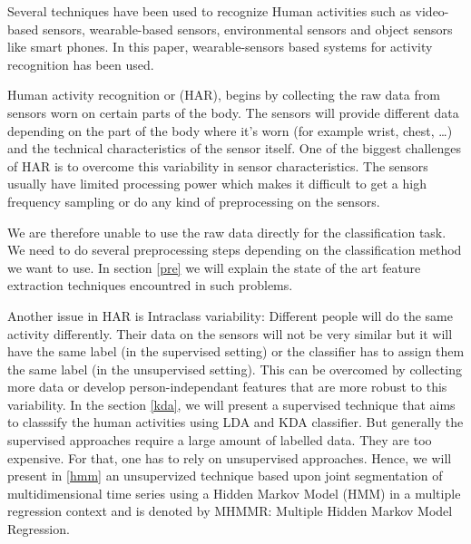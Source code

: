 \documentclass[11pt,a4paper,oneside]{article}
\begin{document}
Several techniques have been used to recognize Human activities such as video-based sensors, wearable-based sensors, environmental sensors and object sensors like smart phones. In this paper, wearable-sensors based systems for activity recognition has been used. 

Human activity recognition or (HAR), begins by collecting the raw data from sensors worn on certain parts of the body. The sensors will provide different data depending on the part of the body where it’s worn (for example wrist, chest, \ldots) and the technical characteristics of the sensor itself. One of the biggest challenges of HAR is to overcome this variability in sensor characteristics. The sensors usually have limited processing power which makes it difficult to get a high frequency sampling or do any kind of preprocessing on the sensors.\cite{bulling}

We are therefore unable to use the raw data directly for the classification task. We need to do several preprocessing steps depending on the classification method we want to use. In section \ref{pre} we will explain the state of the art feature extraction techniques encountred in such problems.

Another issue in HAR is Intraclass variability: Different people will do the same activity differently. Their data on the sensors will not be very similar but it will have the same label (in the supervised setting) or the classifier has to assign them the same label (in the unsupervised setting). This can be overcomed by collecting more data or develop person-independant features that are more robust to this variability. In the section \ref{kda}, we will present a supervised technique that aims to classsify the human activities using LDA and KDA classifier. But generally the supervised approaches require a large amount of labelled data. They are too expensive. For that, one has to rely on unsupervised approaches. Hence, we will present in \ref{hmm} an unsupervized technique  based upon joint segmentation of multidimensional time series using a Hidden Markov Model (HMM) in a multiple regression context and is denoted by MHMMR: Multiple Hidden Markov Model Regression.


\end{document}
